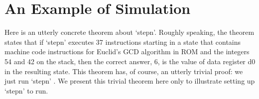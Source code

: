 \addvspace{18pt}

 \newpage \section{An Example of Simulation}
 \label{example}

 Here is an utterly concrete theorem about `stepn'.  Roughly speaking, the
 theorem states that if `stepn' executes 37 instructions starting in a state
 that contains machine code instructions for Euclid's GCD algorithm in ROM and
 the integers 54 and 42 on the stack, then the correct answer, 6, is the value of
 data register d0 in the resulting state.  This theorem has, of course, an
 utterly trivial proof: we just run `stepn' .  We present this trivial theorem
 here only to illustrate setting up `stepn' to run.

